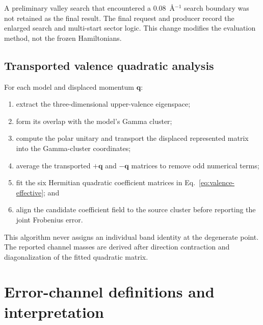 \documentclass[11pt]{article}
\theoremstyle{definition}
\newcommand{\qvec}{\mathbf q}
\begin{document}
A preliminary valley search that encountered a 0.08~\AA$^{-1}$ search boundary was not
retained as the final result.  The final request and producer record the enlarged search
and multi-start sector logic.  This change modifies the evaluation method, not the
frozen Hamiltonians.

\subsection{Transported valence quadratic analysis}

For each model and displaced momentum $\qvec$:
\begin{enumerate}[leftmargin=2em]
 \item extract the three-dimensional upper-valence eigenspace;
 \item form its overlap with the model's Gamma cluster;
 \item compute the polar unitary and transport the displaced represented matrix into the
 Gamma-cluster coordinates;
 \item average the transported $+\qvec$ and $-\qvec$ matrices to remove odd numerical
 terms;
 \item fit the six Hermitian quadratic coefficient matrices in
 Eq.~\eqref{eq:valence-effective}; and
 \item align the candidate coefficient field to the source cluster before reporting the
 joint Frobenius error.
\end{enumerate}

This algorithm never assigns an individual band identity at the degenerate point.  The
reported channel masses are derived after direction contraction and diagonalization of
the fitted quadratic matrix.

\section{Error-channel definitions and interpretation}
\end{document}
